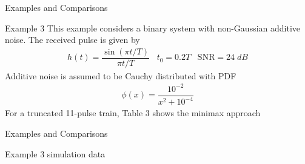 \documentclass{beamer}
\begin{document}
\begin{frame}{Examples and Comparisons}
\begin{block}{Example 3}
 This example considers a binary system with non-Gaussian additive noise. The received pulse is given by
 \begin{align}
h(t) = \dfrac{\sin{(\pi t/T)}}{\pi t/T}\;\;\;t_{0} = 0.2T \;\;\; \text{SNR}= 24\;dB
 \end{align}
Additive noise is assumed to be Cauchy distributed with PDF 
\begin{align}
\phi(x) = \dfrac{10^{-2}}{x^{2}+10^{-4}}
\end{align}
For a truncated 11-pulse train, Table 3 shows the minimax approach
\end{block}
\end{frame}
\begin{frame}{Examples and Comparisons}
\begin{block}{Example 3 simulation data}
\begin{table}[]
    \centering
{}
 \caption{Example 3}
\label{tab:Table 3}
\end{table}
\end{block}
\end{frame}
\end{document}
